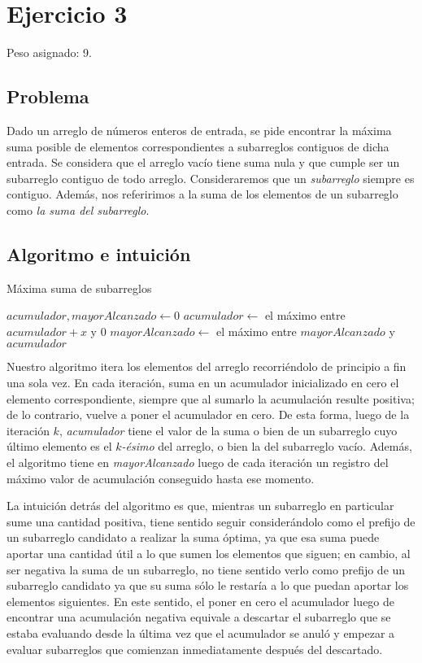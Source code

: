 \section{Ejercicio 3}

Peso asignado: 9.

\subsection{Problema}
Dado un arreglo de números enteros de entrada, se pide encontrar la máxima suma posible de elementos correspondientes a subarreglos contiguos de dicha entrada. Se considera que el arreglo vacío tiene suma nula y que cumple ser un subarreglo contiguo de todo arreglo. Consideraremos que un \textit{subarreglo} siempre es contiguo. Además, nos referirimos a la suma de los elementos de un subarreglo como \textit{la suma del subarreglo}.

\subsection{Algoritmo e intuición}

\begin{algorithm}[H]
	\caption{Máxima suma de subarreglos}
    $\mathit{acumulador, mayorAlcanzado} \gets 0$ \;
     {
        $\mathit{acumulador} \gets$ el máximo entre $\mathit{acumulador}+x$ y $0$ \;
        $\mathit{mayorAlcanzado} \gets$ el máximo entre $\mathit{mayorAlcanzado}$ y $\mathit{acumulador}$
    }
\end{algorithm}

\bigskip

Nuestro algoritmo itera los elementos del arreglo recorriéndolo de principio a fin una sola vez. En cada iteración, suma en un acumulador inicializado en cero el elemento correspondiente, siempre que al sumarlo la acumulación resulte positiva; de lo contrario, vuelve a poner el acumulador en cero. De esta forma, luego de la iteración $k$, \textit{acumulador} tiene el valor de la suma o bien de un subarreglo cuyo último elemento es el $k$\textit{-ésimo} del arreglo, o bien la del subarreglo vacío. Además, el algoritmo tiene en \textit{mayorAlcanzado} luego de cada iteración un registro del máximo valor de acumulación conseguido hasta ese momento.

La intuición detrás del algoritmo es que, mientras un subarreglo en particular sume una cantidad positiva, tiene sentido seguir considerándolo como el prefijo de un subarreglo candidato a realizar la suma óptima, ya que esa suma puede aportar una cantidad útil a lo que sumen los elementos que siguen; en cambio, al ser negativa la suma de un subarreglo, no tiene sentido verlo como prefijo de un subarreglo candidato ya que su suma sólo le restaría a lo que puedan aportar los elementos siguientes. En este sentido, el poner en cero el acumulador luego de encontrar una acumulación negativa equivale a descartar el subarreglo que se estaba evaluando desde la última vez que el acumulador se anuló y empezar a evaluar subarreglos que comienzan inmediatamente después del descartado.

